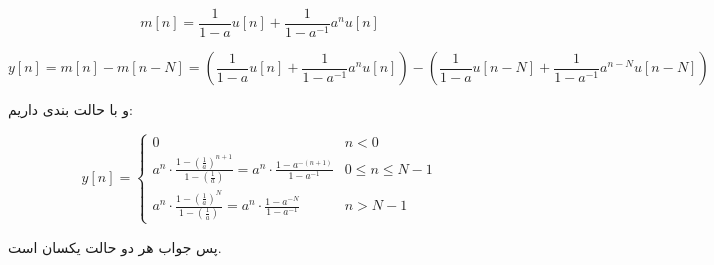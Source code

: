 \documentclass[12pt]{article}
\begin{document}
\begin{enumerate}[label = \Alph*)]
$$m[n] = \frac{1}{1-a} u[n] + \frac{1}{1-a^{-1}} a^n u[n]$$

$$y[n] = m[n] - m[n-N] =(\frac{1}{1-a} u[n] + \frac{1}{1-a^{-1}} a^n u[n]) - (\frac{1}{1-a} u[n-N] + \frac{1}{1-a^{-1}} a^{n-N} u[n-N]) $$

و با حالت بندی داریم:

$$
y[n]=\left\{\begin{array}{ll}
	0 & n<0 \\
	a^{n} \cdot \frac{1-\left(\frac{1}{a}\right)^{n+1}}{1-\left(\frac{1}{a}\right)}=a^{n} \cdot \frac{1-a^{-(n+1)}}{1-a^{-1}} & 0 \leq n \leq N-1 \\
	a^{n} \cdot \frac{1-\left(\frac{1}{a}\right)^{N}}{1-\left(\frac{1}{a}\right)}=a^{n} \cdot \frac{1-a^{-N}}{1-a^{-1}} & n>N-1
\end{array}\right.
$$

پس جواب هر دو حالت یکسان است.

\end{enumerate}
\end{document}
